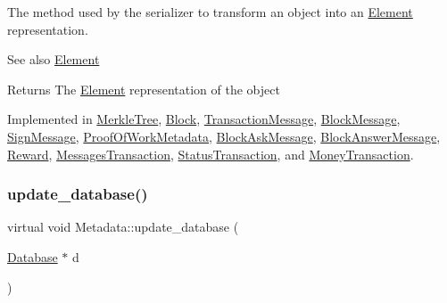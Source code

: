 The method used by the serializer to transform an object into an \mbox{\hyperlink{classElement}{Element}} representation. \begin{DoxySeeAlso}{See also}
\mbox{\hyperlink{classElement}{Element}}
\end{DoxySeeAlso}
\begin{DoxyReturn}{Returns}
The \mbox{\hyperlink{classElement}{Element}} representation of the object 
\end{DoxyReturn}


Implemented in \mbox{\hyperlink{classMerkleTree_a4e72819c6cbc49ed8ce092f464711a5f}{Merkle\+Tree}}, \mbox{\hyperlink{classBlock_aa289363a40f0d3ba88720ad0bc71f34f}{Block}}, \mbox{\hyperlink{classTransactionMessage_ae20e7d6a7b5811bb56a32ec6af59b8e2}{Transaction\+Message}}, \mbox{\hyperlink{classBlockMessage_ab47afd5cfb7d6d5c544d8def5d0f9737}{Block\+Message}}, \mbox{\hyperlink{classSignMessage_aee897c4bf78df966b8cca95e589566e4}{Sign\+Message}}, \mbox{\hyperlink{classProofOfWorkMetadata_a2aab4c26afb3a85a712cc065028274d9}{Proof\+Of\+Work\+Metadata}}, \mbox{\hyperlink{classBlockAskMessage_a0bc20076f19423855ab5772003fb65f6}{Block\+Ask\+Message}}, \mbox{\hyperlink{classBlockAnswerMessage_ac7f35ec9f7f2fbcd726628c2a984518b}{Block\+Answer\+Message}}, \mbox{\hyperlink{classReward_a0ecd536148463880f9980fe415b6eb1d}{Reward}}, \mbox{\hyperlink{classMessagesTransaction_a0ef8ec080a2698a02ad8b1b95d243720}{Messages\+Transaction}}, \mbox{\hyperlink{classStatusTransaction_aed42f2d61f2d50ec07bb6b35473f61f2}{Status\+Transaction}}, and \mbox{\hyperlink{classMoneyTransaction_a84adc847266467965014cb04acd48bea}{Money\+Transaction}}.

\mbox{\label{classMetadata_a501ab1977aac6a75f92309284e17de30}} 
\subsubsection{\texorpdfstring{update\+\_\+database()}{update\_database()}}
{\footnotesize\ttfamily virtual void Metadata\+::update\+\_\+database (\begin{DoxyParamCaption}\item[{\mbox{\hyperlink{classDatabase}{Database}} $\ast$}]{d }\end{DoxyParamCaption})\hspace{0.3cm}{\ttfamily [pure virtual]}}

